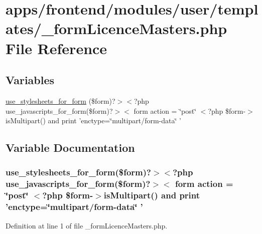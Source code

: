 \hypertarget{frontend_2modules_2user_2templates_2__form_licence_masters_8php}{\section{apps/frontend/modules/user/templates/\-\_\-form\-Licence\-Masters.php File Reference}
\label{frontend_2modules_2user_2templates_2__form_licence_masters_8php}
}
\subsection*{Variables}
\begin{DoxyCompactItemize}
\item 
\hyperlink{frontend_2modules_2user_2templates_2__form_licence_masters_8php_a00a269e565f040b15540e79f3fb02a19}{use\-\_\-stylesheets\-\_\-for\-\_\-form} (\$form)?$>$$<$?php use\-\_\-javascripts\-\_\-for\-\_\-form(\$form)?$>$$<$ form action = \char`\"{}post\char`\"{} $<$?php \$form-\/$>$is\-Multipart() and print 'enctype=\char`\"{}multipart/form-\/data\char`\"{} '
\end{DoxyCompactItemize}


\subsection{Variable Documentation}
\hypertarget{frontend_2modules_2user_2templates_2__form_licence_masters_8php_a00a269e565f040b15540e79f3fb02a19}{
\subsubsection[{use\-\_\-stylesheets\-\_\-for\-\_\-form}]{\setlength{\rightskip}{0pt plus 5cm}use\-\_\-stylesheets\-\_\-for\-\_\-form(\$form)?$>$$<$?php use\-\_\-javascripts\-\_\-for\-\_\-form(\$form)?$>$$<$ form action = \char`\"{}post\char`\"{} $<$?php \$form-\/$>$is\-Multipart() and print 'enctype=\char`\"{}multipart/form-\/data\char`\"{} '}}\label{frontend_2modules_2user_2templates_2__form_licence_masters_8php_a00a269e565f040b15540e79f3fb02a19}


Definition at line 1 of file \-\_\-form\-Licence\-Masters.\-php.


